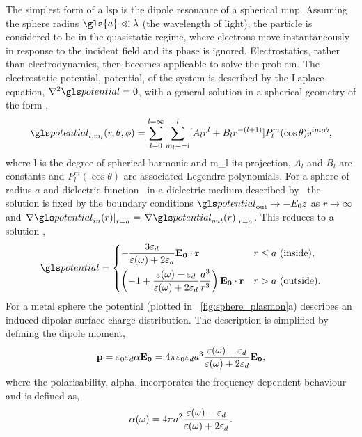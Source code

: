 \documentclass{article}
\begin{document}
The simplest form of a \gls{lsp} is the dipole resonance of a spherical \gls{mnp}. Assuming the sphere radius $\gls{a}\ll\lambda$ (the wavelength of light), the particle is considered to be in the quasistatic regime, where electrons move instantaneously in response to the incident field and its phase is ignored. Electrostatics, rather than electrodynamics, then becomes applicable to solve the problem. The electrostatic potential, \gls{potential}, of the system is described by the Laplace equation, $\nabla^2\pot=0$, with a general solution in a spherical geometry of the form \cite{maier2007plasmonics},
\begin{equation}
	\pot_{l,m_l}(r,\theta,\phi) = \sum_{l=0}^{l=\infty} \sum_{m_l=-l}^l [ A_lr^l + B_lr^{-(l+1)} ] P_l^m (\cos\theta) \e^{i m_l\phi},
\end{equation}
where \gls{l} is the degree of spherical harmonic and \gls{m_l} its projection, $A_l$ and $B_l$ are constants and $P_l^m(\cos\theta)$ are associated Legendre polynomials. For a sphere of radius $a$ and dielectric function \dielectric\ in a dielectric medium described by \epsdi\ the solution is fixed by the boundary conditions $\pot_{\mathrm{out}}\rightarrow-E_0z$ as $r\rightarrow\infty$ and $\left.\nabla\pot_{in}(r)\right|_{r=a}=\left.\nabla\pot_{out}(r)\right|_{r=a}$. This reduces to a solution \cite{jackson1999classical},
\begin{equation}
	\pot =
	\begin{dcases}
	-\frac{3\epsdi}{\dielectric + 2\epsdi} \vec{E_0}\cdot\vec{r} & r \leq a\text{ (inside)}, \\
	\left(-1 + \frac{\dielectric - \epsdi}{\dielectric + 2\epsdi} \frac{a^3}{r^3}\right) \vec{E_0}\cdot\vec{r} & r > a\text{ (outside)}.
	\end{dcases}
\end{equation}
For a metal sphere the potential (plotted in \figurename~\ref{fig:sphere_plasmon}a) describes an induced dipolar surface charge distribution. The description is simplified by defining the dipole moment,
\begin{equation}
	\mathbf{p} = \varepsilon_0\varepsilon_d\alpha\mathbf{E_0} = 4\pi\varepsilon_0\varepsilon_d a^3 \frac{\varepsilon(\omega) - \varepsilon_d}{\varepsilon(\omega) + 2\varepsilon_d} \mathbf{E_0},
\end{equation}
where the polarisability, \gls{alpha}, incorporates the frequency dependent behaviour and is defined as,
\begin{equation}
	\alpha(\omega) = 4\pi a^2 \frac{\varepsilon(\omega) - \varepsilon_d}{\varepsilon(\omega) + 2\varepsilon_d}.
	\label{eq:polarisability}
\end{equation}
\end{document}
